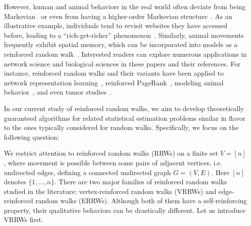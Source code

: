 \documentclass[a4paper, 11pt]{article}
\begin{document}
However, human and animal behaviors in the real world often deviate from being Markovian~\cite{mgr} or even from having a higher-order Markovian structure~\cite{bgl}. As an illustrative example, individuals tend to revisit websites they have accessed before, leading to a “rich-get-richer” phenomenon~\cite{mgr}. Similarly, animal movements frequently exhibit spatial memory, which can be incorporated into models as a reinforced random walk~\cite{fmk}. Interested readers can explore numerous applications in network science and biological sciences in these papers and their references. For instance, reinforced random walks and their variants have been applied to network representation learning~\cite{xzzs}, reinforced PageRank~\cite{gly}, modeling animal behavior~\cite{smouse}, and even tumor studies~\cite{ps}.

In our current study of reinforced random walks, we aim to develop theoretically guaranteed algorithms for related statistical estimation problems similar in flavor to the ones typically considered for random walks. Specifically, we focus on the following question:

\vspace{.3em}
\begin{center}
\noindent{}
\end{center}
\vspace{.3em}

We 
restrict attention to
reinforced random walks (RRWs) on a finite set $V=[n]$,
where movement is possible between some pairs of adjacent vertices, i.e. undirected edges, defining a connected undirected graph $G=(V, E)$.
Here $[n]$ denotes $\{1, \ldots, n\}$. 
There are two major families of reinforced random walks studied in the literature: vertex-reinforced random walks (VRRWs) and edge-reinforced random walks (ERRWs). Although both of them have a self-reinforcing property, their qualitative behaviors can be drastically different. 
Let us introduce VRRWs first.
\end{document}
